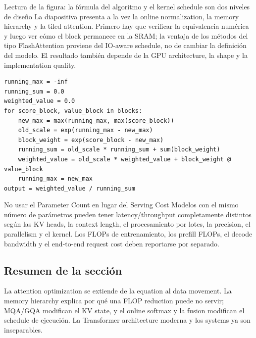 \begin{knowledgebox}{Lectura de la figura: la fórmula del algoritmo y el kernel schedule son dos niveles de diseño}
La diapositiva presenta a la vez la online normalization, la memory hierarchy y la tiled attention. Primero hay que verificar la equivalencia numérica y luego ver cómo el block permanece en la SRAM; la ventaja de los métodos del tipo FlashAttention proviene del IO-aware schedule, no de cambiar la definición del modelo. El resultado también depende de la GPU architecture, la shape y la implementation quality.
\end{knowledgebox}

\begin{lstlisting}[caption={Pseudocódigo conceptual de la normalización en flujo del online softmax}]
running_max = -inf
running_sum = 0.0
weighted_value = 0.0
for score_block, value_block in blocks:
    new_max = max(running_max, max(score_block))
    old_scale = exp(running_max - new_max)
    block_weight = exp(score_block - new_max)
    running_sum = old_scale * running_sum + sum(block_weight)
    weighted_value = old_scale * weighted_value + block_weight @ value_block
    running_max = new_max
output = weighted_value / running_sum
\end{lstlisting}

\begin{warningbox}{No usar el Parameter Count en lugar del Serving Cost}
Modelos con el mismo número de parámetros pueden tener latency/throughput completamente distintos según las KV heads, la context length, el procesamiento por lotes, la precision, el parallelism y el kernel. Los FLOPs de entrenamiento, los prefill FLOPs, el decode bandwidth y el end-to-end request cost deben reportarse por separado.
\end{warningbox}

\subsection{Resumen de la sección}

La attention optimization se extiende de la equation al data movement. La memory hierarchy explica por qué una FLOP reduction puede no servir; MQA/GQA modifican el KV state, y el online softmax y la fusion modifican el schedule de ejecución. La Transformer architecture moderna y los systems ya son inseparables.
